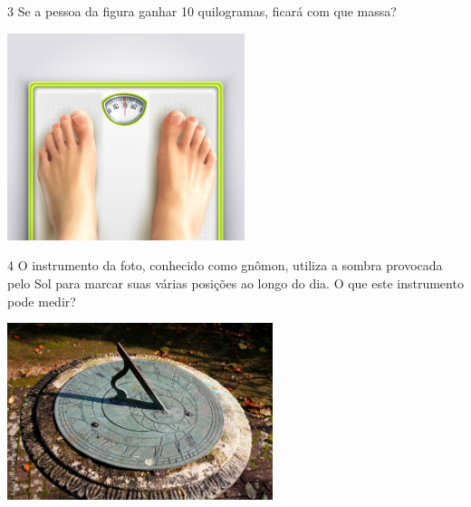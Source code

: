 
\num{3} Se a pessoa da figura ganhar 10 quilogramas, ficará com que massa?


\includegraphics[width=2.72917in,height=2.37665in]{media/image44.jpeg}


\num{4} O instrumento da foto, conhecido como gnômon, utiliza a sombra
provocada pelo Sol para marcar suas várias posições ao longo do dia. O
que este instrumento pode medir?


\includegraphics[width=3.05208in,height=2.03472in]{media/image45.jpeg}

